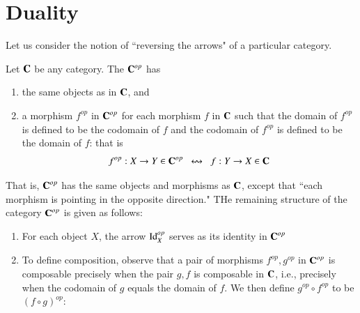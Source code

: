 \documentclass[12pt, a4paper, oneside, openright, titlepage]{book}
\begin{document}
\section{Duality}

Let us consider the notion of ``reversing the arrows" of a particular category.

\begin{defn}
    Let $\normalfont\textbf{C}$ be any category. The  $\normalfont\textbf{C}^{op}$ has \begin{enumerate}
        \item the same objects as in $\normalfont\textbf{C}$, and 
        \item a morphism $f^{op}$ in $\normalfont\textbf{C}^{op}$ for each morphism $f$ in $\normalfont\textbf{C}$ such that the domain of $f^{op}$ is defined to be the codomain of $f$ and the codomain of $f^{op}$ is defined to be the domain of $f$: that is \begin{equation*}
                f^{op}:X\rightarrow Y \in \normalfont\textbf{C}^{op} \;\;\leftrightsquigarrow\;\;f:Y\rightarrow X\in\normalfont\textbf{C}
        \end{equation*}
    \end{enumerate}
    That is, $\normalfont\textbf{C}^{op}$ has the same objects and morphisms as $\normalfont\textbf{C}$, except that ``each morphism is pointing in the opposite direction." THe remaining structure of the category $\normalfont\textbf{C}^{op}$ is given as follows: \begin{enumerate}
        \item For each object $X$, the arrow $\operatorname{Id}_X^{op}$ serves as its identity in $\normalfont\textbf{C}^{op}$
        \item To define composition, observe that a pair of morphisms $f^{op}, g^{op}$ in $\normalfont\textbf{C}^{op}$ is composable precisely when the pair $g,f$ is composable in $\normalfont\textbf{C}$, i.e., precisely when the codomain of $g$ equals the domain of $f$. We then define $g^{op}\circ f^{op}$ to be $(f\circ g)^{op}$: 
            \begin{center}
            \end{center} 
    \end{enumerate}
\end{defn}
\end{document}
